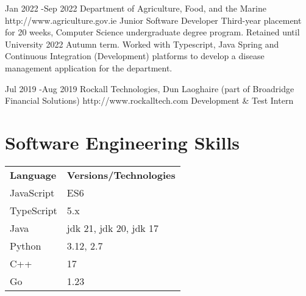 \documentclass[10pt]{article} %
\begin{document}

\job
{Jan 2022 -}{Sep 2022} {Department of Agriculture, Food, and the Marine}
{http://www.agriculture.gov.ie} {Junior Software Developer} {Third-year
placement for 20 weeks, Computer Science undergraduate degree program. Retained
until University 2022 Autumn term. Worked with Typescript, Java Spring and
Continuous Integration (Development) platforms to develop a disease management
application for the department.}


\job
{Jul 2019 -}{Aug 2019} {Rockall Technologies, Dun Laoghaire (part of Broadridge
Financial Solutions)} {http://www.rockalltech.com} {Development \& Test Intern}
{}



\newpage
\section{Software Engineering Skills}

{
    \begin{tabular}{l l}
        \textbf{Language} & \textbf{Versions/Technologies} \\
        JavaScript & ES6 \\
        TypeScript & 5.x \\
        Java & jdk 21, jdk 20, jdk 17 \\
        Python & 3.12, 2.7 \\
        C++ & 17 \\
        Go & 1.23 \\
    \end{tabular}
}
\end{document}
